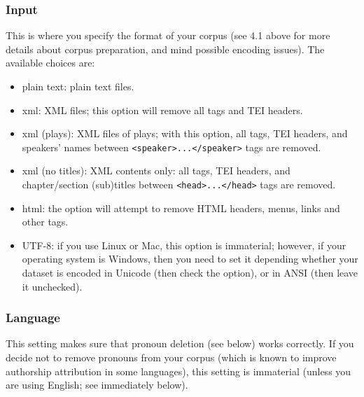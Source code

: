 \documentclass[11pt,a4paper]{article}
\def\margin#1{\marginpar{\textcolor{blue}{\footnotesize\tt #1}}}
\def\code#1{{\tt #1}}
\begin{document}
\subsubsection{Input}

This is where you specify the format of your corpus (see 4.1 above
for more details about corpus preparation, and mind possible encoding
issues). The available choices are:\margin{corpus.format=}

\begin{itemize}
  \item plain text: plain text files.\margin{"plain"} 
  
  \item xml: XML files; this option will remove all tags and TEI headers.\margin{"xml"} 
  
  \item xml (plays): XML files of plays; with this option, all tags, TEI headers,
  and speakers' names between \code{<speaker>...</speaker>} tags
  are removed.\margin{"xml.drama"} 
  
  \item xml (no titles): XML contents only: all tags, TEI headers, and chapter/section
  (sub)titles between \code{<head>...</head>} tags are removed.\margin{"xml.notitles"} 

  \item html: the option will attempt to remove HTML headers, menus, links
  and other tags.\margin{"html"} 
  
  \item UTF-8:\margin{encoding=}\margin{"UTF-8"}\margin{"native.enc"} if you use Linux or Mac, this option is immaterial; however, if your operating system is Windows, then you need to set it depending whether your dataset is encoded in Unicode (then check the option), or in ANSI (then leave it unchecked).
\end{itemize}

\subsubsection{Language}

This setting makes sure that pronoun deletion (see below) works correctly.
If you decide not to remove pronouns from your corpus (which is known
to improve authorship attribution in some languages), this setting
is immaterial (unless you are using English; see immediately below).\margin{corpus.lang=}
\end{document}
